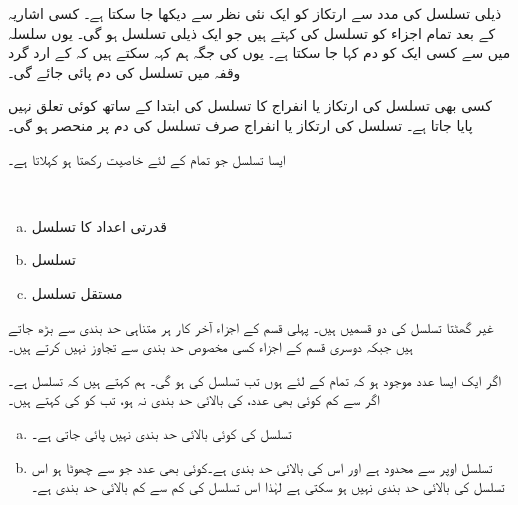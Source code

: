 ذیلی تسلسل کی مدد سے ارتکاز کو ایک نئی نظر سے دیکھا جا سکتا ہے۔ کسی اشاریہ  کے بعد تمام اجزاء کو تسلسل کی  کہتے ہیں جو ایک ذیلی تسلسل ہو گی۔ یوں سلسلہ  میں سے کسی ایک کو دم کہا جا سکتا ہے۔ یوں  کی جگہ ہم کہہ سکتے ہیں کہ  کے ارد گرد  وقفہ میں تسلسل کی دم پائی جائے گی۔

کسی بھی تسلسل کی ارتکاز یا انفراج کا تسلسل کی ابتدا کے ساتھ کوئی تعلق نہیں پایا جاتا ہے۔ تسلسل کی ارتکاز یا انفراج صرف تسلسل کی دم پر منحصر ہو گی۔

ایسا تسلسل جو تمام  کے لئے  خاصیت رکھتا ہو  کہلاتا ہے۔ 

\\
\begin{enumerate}[a.]
\item
قدرتی اعداد کا تسلسل 
\item
تسلسل 
\item
مستقل تسلسل 
\end{enumerate}

غیر گھٹتا تسلسل کی دو قسمیں ہیں۔ پہلی قسم کے اجزاء آخر کار ہر متناہی حد بندی سے بڑھ جاتے ہیں جبکہ دوسری قسم کے اجزاء کسی مخصوص حد بندی سے تجاوز نہیں کرتے ہیں۔

اگر ایک ایسا عدد  موجود ہو کہ تمام  کے لئے  ہوں تب تسلسل  کی   ہو گی۔ ہم کہتے ہیں کہ تسلسل   ہے۔ اگر  سے کم کوئی بھی عدد،  کی بالائی حد بندی نہ ہو، تب  کو  کی  کہتے ہیں۔

\begin{enumerate}[a.]
\item
تسلسل  کی کوئی بالائی حد بندی نہیں پائی جاتی ہے۔
\item
تسلسل  اوپر سے محدود ہے اور اس کی بالائی حد بندی  ہے۔کوئی بھی عدد جو  سے چھوٹا ہو اس تسلسل کی بالائی حد بندی نہیں ہو سکتی ہے لہٰذا اس تسلسل کی کم سے کم بالائی حد بندی  ہے۔
\end{enumerate}

